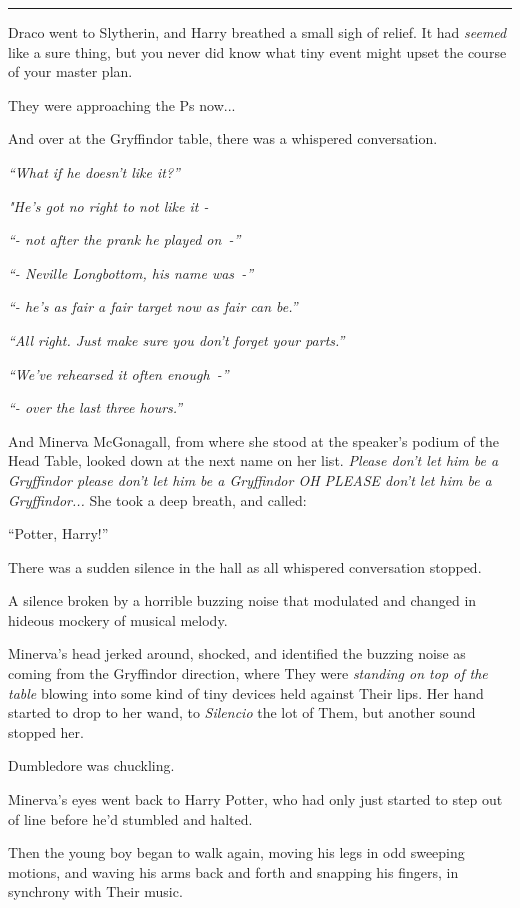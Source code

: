 \begin{center}\rule{3in}{0.4pt}\end{center}

Draco went to Slytherin, and Harry breathed a small sigh of relief. It had \emph{seemed} like a sure thing, but you never did know what tiny event might upset the course of your master plan.

They were approaching the Ps now...

And over at the Gryffindor table, there was a whispered conversation.

\emph{``What if he doesn't like it?''}

\emph{"He's got no right to not like it -}

\emph{``- not after the prank he played on~-''}

\emph{``- Neville Longbottom, his name was~-''}

\emph{``- he's as fair a fair target now as fair can be.''}

\emph{``All right. Just make sure you don't forget your parts.''}

\emph{``We've rehearsed it often enough~-''}

\emph{``- over the last three hours.''}

And Minerva McGonagall, from where she stood at the speaker's podium of the Head Table, looked down at the next name on her list. \emph{Please don't let him be a Gryffindor please don't let him be a Gryffindor OH PLEASE don't let him be a Gryffindor...} She took a deep breath, and called:

``Potter, Harry!''

There was a sudden silence in the hall as all whispered conversation stopped.

A silence broken by a horrible buzzing noise that modulated and changed in hideous mockery of musical melody.

Minerva's head jerked around, shocked, and identified the buzzing noise as coming from the Gryffindor direction, where They were \emph{standing on top of the table} blowing into some kind of tiny devices held against Their lips. Her hand started to drop to her wand, to \emph{Silencio} the lot of Them, but another sound stopped her.

Dumbledore was chuckling.

Minerva's eyes went back to Harry Potter, who had only just started to step out of line before he'd stumbled and halted.

Then the young boy began to walk again, moving his legs in odd sweeping motions, and waving his arms back and forth and snapping his fingers, in synchrony with Their music.

